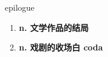 
\begin{frame}
{\huge epilogue}
\begin{center}
\begin{enumerate}\Large
  \item \textbf{n. 文学作品的结局}
  \item \textbf{n. 戏剧的收场白 coda}
\end{enumerate}
\end{center}
\end{frame}
